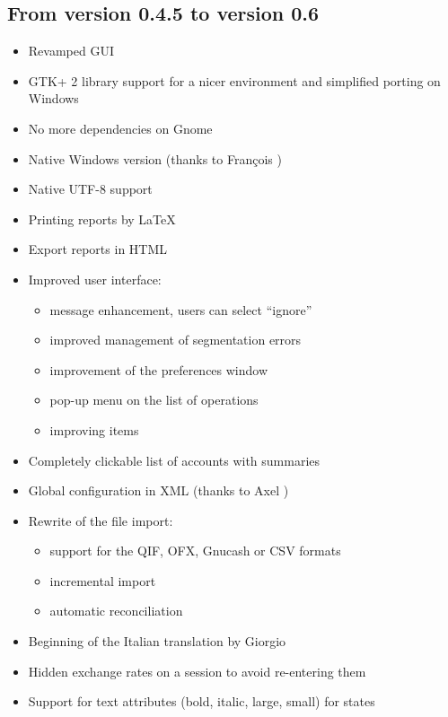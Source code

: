 \subsection{From version 0.4.5 to version 0.6}

\begin{itemize}
	\item Revamped GUI
	\item \gls{GTK}+ 2 library support for a nicer environment and simplified porting on Windows
	\item No more dependencies on \gls{Gnome}
	\item Native Windows version (thanks to François )
	\item Native \gls{UTF-8} support 
	\item Printing reports by \gls{LaTeX}
	\item Export reports in \gls{HTML}
	\item Improved user interface:
		\begin{itemize}
		\item[\textopenbullet] message enhancement, users can select ``ignore''
		\item[\textopenbullet] improved management of segmentation errors
		\item[\textopenbullet] improvement of the preferences window
		\item[\textopenbullet] pop-up menu on the list of operations
		\item[\textopenbullet] improving items
		\end{itemize}
	\item Completely clickable list of accounts with summaries
	\item Global configuration in \gls{XML} (thanks to Axel )
	\item Rewrite of the file import:
		\begin{itemize}
		\item[\textopenbullet] support for the \gls{QIF}, \gls{OFX}, \gls{Gnucash} or \gls{CSV}  formats
		\item[\textopenbullet] incremental import
		\item[\textopenbullet] automatic reconciliation
		\end{itemize}
	\item Beginning of the Italian translation by Giorgio 
	\item Hidden exchange rates on a session to avoid re-entering them
	\item Support for text attributes (bold, italic, large, small) for states

\end{itemize}
